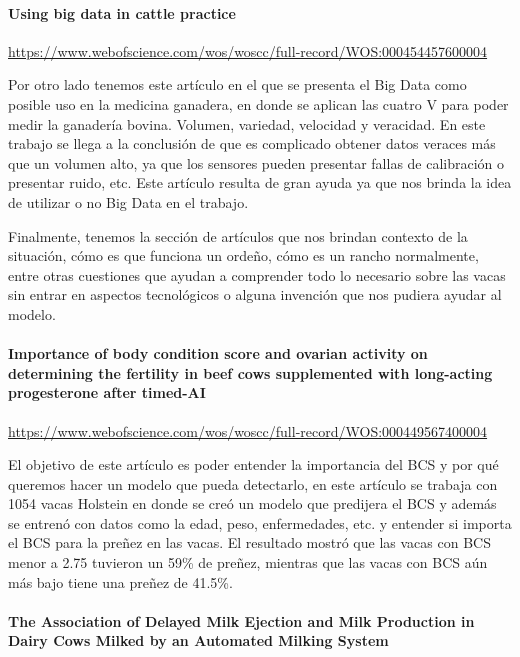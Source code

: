 \paragraph{Using big data in cattle practice}

\url{https://www.webofscience.com/wos/woscc/full-record/WOS:000454457600004}

Por otro lado tenemos este artículo en el que se presenta el Big Data como posible uso en la medicina ganadera, en donde se aplican las cuatro V para poder medir la ganadería bovina. Volumen, variedad, velocidad y veracidad. En este trabajo se llega a la conclusión de que es complicado obtener datos veraces más que un volumen alto, ya que los sensores pueden presentar fallas de calibración o presentar ruido, etc. Este artículo resulta de gran ayuda ya que nos brinda la idea de utilizar o no Big Data en el trabajo.

Finalmente, tenemos la sección de artículos que nos brindan contexto de la situación, cómo es que funciona un ordeño, cómo es un rancho normalmente, entre otras cuestiones que ayudan a comprender todo lo necesario sobre las vacas sin entrar en aspectos tecnológicos o alguna invención que nos pudiera ayudar al modelo.

\paragraph{Importance of body condition score and ovarian activity on determining the fertility in beef cows supplemented with long-acting progesterone after timed-AI}

\url{https://www.webofscience.com/wos/woscc/full-record/WOS:000449567400004}

El objetivo de este artículo es poder entender la importancia del BCS y por qué queremos hacer un modelo que pueda detectarlo, en este artículo se trabaja con 1054 vacas Holstein en donde se creó un modelo que predijera el BCS y además se entrenó con datos como la edad, peso, enfermedades, etc. y entender si importa el BCS para la preñez en las vacas. El resultado mostró que las vacas con BCS menor a 2.75 tuvieron un 59\% de preñez, mientras que las vacas con BCS aún más bajo tiene una preñez de 41.5\%.

\paragraph{The Association of Delayed Milk Ejection and Milk Production in Dairy Cows Milked by an Automated Milking System}

